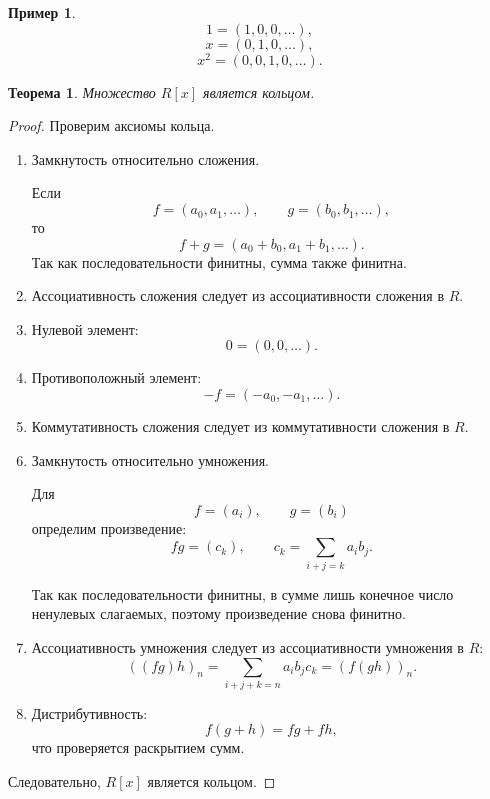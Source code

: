\documentclass[12pt, a4paper]{article}
\newtheorem{theorem}{Теорема}
\theoremstyle{definition}
\newtheorem{example}{Пример}
\theoremstyle{remark}
\begin{document}
\begin{example}
	\[
	1=(1,0,0,\dots),
	\]
	\[
	x=(0,1,0,\dots),
	\]
	\[
	x^2=(0,0,1,0,\dots).
	\]
\end{example}

\begin{theorem}
	Множество $R[x]$ является кольцом.
\end{theorem}

\begin{proof}
	Проверим аксиомы кольца.
	
	\begin{enumerate}
		\item Замкнутость относительно сложения.
		
		Если
		\[
		f=(a_0,a_1,\dots),
		\qquad
		g=(b_0,b_1,\dots),
		\]
		то
		\[
		f+g=(a_0+b_0,a_1+b_1,\dots).
		\]
		Так как последовательности финитны, сумма также финитна.
		
		\item Ассоциативность сложения следует из ассоциативности сложения в $R$.
		
		\item Нулевой элемент:
		\[
		0=(0,0,\dots).
		\]
		
		\item Противоположный элемент:
		\[
		-f=(-a_0,-a_1,\dots).
		\]
		
		\item Коммутативность сложения следует из коммутативности сложения в $R$.
		
		\item Замкнутость относительно умножения.
		
		Для
		\[
		f=(a_i),\qquad g=(b_i)
		\]
		определим произведение:
		\[
		fg=(c_k),
		\qquad
		c_k=\sum_{i+j=k} a_i b_j.
		\]
		
		Так как последовательности финитны, в сумме лишь конечное число
		ненулевых слагаемых, поэтому произведение снова финитно.
		
		\item Ассоциативность умножения следует из ассоциативности умножения в $R$:
		\[
		((fg)h)_n
		=
		\sum_{i+j+k=n} a_i b_j c_k
		=
		(f(gh))_n.
		\]
		
		\item Дистрибутивность:
		\[
		f(g+h)=fg+fh,
		\]
		что проверяется раскрытием сумм.
		
	\end{enumerate}
	
	Следовательно, $R[x]$ является кольцом.
\end{proof}
\end{document}
